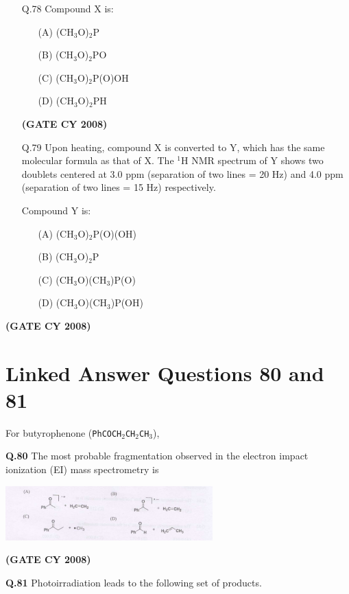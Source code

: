 \documentclass[12pt]{article}
\begin{document}
\begin{enumerate}
\begin{itemize}
    \item[Q.78] Compound X is:
    \begin{enumerate}
        \item[(A)] (CH$_3$O)$_2$P
        \item[(B)] (CH$_3$O)$_2$PO
        \item[(C)] (CH$_3$O)$_2$P(O)OH
        \item[(D)] (CH$_3$O)$_2$PH
    \end{enumerate}   \textbf{(GATE CY 2008)}


    \item[Q.79] Upon heating, compound X is converted to Y, which has the same molecular formula as that of X. The $^1$H NMR spectrum of Y shows two doublets centered at 3.0 ppm (separation of two lines = 20 Hz) and 4.0 ppm (separation of two lines = 15 Hz) respectively.

    Compound Y is:
    \begin{enumerate}
        \item[(A)] (CH$_3$O)$_2$P(O)(OH)
        \item[(B)] (CH$_3$O)$_2$P
        \item[(C)] (CH$_3$O)(CH$_3$)P(O)
        \item[(D)] (CH$_3$O)(CH$_3$)P(OH)
    \end{enumerate}
\end{itemize}   \textbf{(GATE CY 2008)}


\section*{Linked Answer Questions 80 and 81}

For butyrophenone (\texttt{PhCOCH\(_2\)CH\(_2\)CH\(_3\)}),

\textbf{Q.80} \quad The most probable fragmentation observed in the electron impact ionization (EI) mass spectrometry is

\begin{center}
\includegraphics[width=0.6\textwidth]{figs/q80.png}
\end{center}   \textbf{(GATE CY 2008)}


\textbf{Q.81} \quad Photoirradiation leads to the following set of products.


\end{enumerate}
\end{document}
